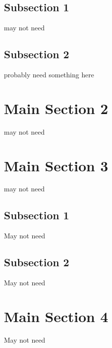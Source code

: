 \subsection{Subsection 1}

may not need


\subsection{Subsection 2}
probably need something here


\section{Main Section 2}

may not need


\section{Main Section 3}

may not need

\subsection{Subsection 1}

May not need


\subsection{Subsection 2}
May not need

\section{Main Section 4}

May not need